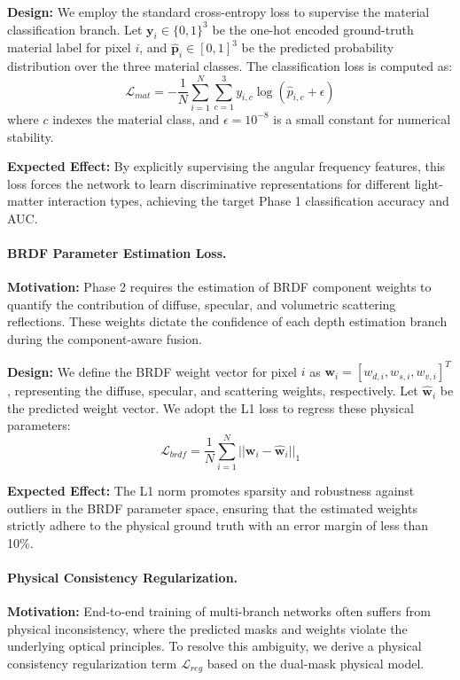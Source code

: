\textbf{Design:} We employ the standard cross-entropy loss to supervise the material classification branch. Let $\mathbf{y}_i \in \{0, 1\}^3$ be the one-hot encoded ground-truth material label for pixel $i$, and $\hat{\mathbf{p}}_i \in [0, 1]^3$ be the predicted probability distribution over the three material classes. The classification loss is computed as:
\begin{equation}
\label{eq:eq45}
\mathcal{L}_{mat} = -\frac{1}{N} \sum_{i=1}^{N} \sum_{c=1}^{3} y_{i,c} \log(\hat{p}_{i,c} + \epsilon)
\end{equation}
where $c$ indexes the material class, and $\epsilon = 10^{-8}$ is a small constant for numerical stability.

\textbf{Expected Effect:} By explicitly supervising the angular frequency features, this loss forces the network to learn discriminative representations for different light-matter interaction types, achieving the target Phase 1 classification accuracy and AUC.

\paragraph{BRDF Parameter Estimation Loss.}
\textbf{Motivation:} Phase 2 requires the estimation of BRDF component weights to quantify the contribution of diffuse, specular, and volumetric scattering reflections. These weights dictate the confidence of each depth estimation branch during the component-aware fusion.

\textbf{Design:} We define the BRDF weight vector for pixel $i$ as $\mathbf{w}_i = [w_{d,i}, w_{s,i}, w_{v,i}]^T$, representing the diffuse, specular, and scattering weights, respectively. Let $\hat{\mathbf{w}}_i$ be the predicted weight vector. We adopt the L1 loss to regress these physical parameters:
\begin{equation}
\label{eq:eq46}
\mathcal{L}_{brdf} = \frac{1}{N} \sum_{i=1}^{N} || \mathbf{w}_i - \hat{\mathbf{w}}_i ||_1
\end{equation}

\textbf{Expected Effect:} The L1 norm promotes sparsity and robustness against outliers in the BRDF parameter space, ensuring that the estimated weights strictly adhere to the physical ground truth with an error margin of less than 10\%.

\paragraph{Physical Consistency Regularization.}
\textbf{Motivation:} End-to-end training of multi-branch networks often suffers from physical inconsistency, where the predicted masks and weights violate the underlying optical principles. To resolve this ambiguity, we derive a physical consistency regularization term $\mathcal{L}_{reg}$ based on the dual-mask physical model.

